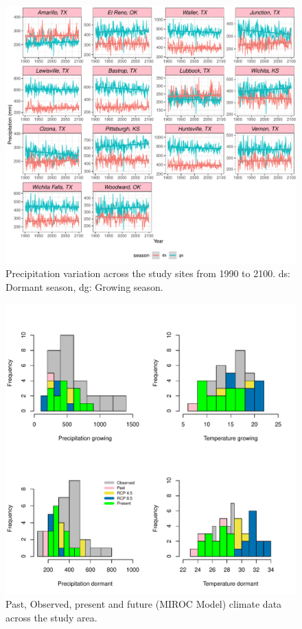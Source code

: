 \documentclass[12pt]{article}
\begin{document}
\begin{figure}[H]
		\centering
		\includegraphics[width=0.95\linewidth]{Figures/fig_pr_past_present_future.pdf}
		\caption{Precipitation variation across the study sites from 1990 to 2100.
		ds: Dormant season, dg: Growing season.}
		\label{Sup:pr_variation}
\end{figure}

\begin{figure}[H]
		\centering
		\includegraphics[width=0.95\linewidth]{Figures/MIROC.pdf}
		\caption{Past, Observed, present and future (MIROC Model) climate data across the study area.}
		\label{Sup:projectionMIROC}
\end{figure}
\end{document}
